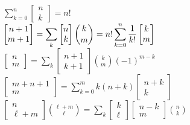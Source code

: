 ${\displaystyle \sum_{k=0}^n \left[\begin{matrix} n \\ k \end{matrix}\right] = n!}$\\
${\displaystyle \left[\begin{matrix} n+1 \\ m+1 \end{matrix}\right] = \sum_k \left[\begin{matrix} n \\ k \end{matrix}\right] {k \choose m} = n! \sum_{k=0}^n {1 \over k!} \left[\begin{matrix} k \\ m \end{matrix}\right]}$\\
${\displaystyle \left[\begin{matrix} n \\ m \end{matrix}\right] = \sum_k \left[\begin{matrix} n+1 \\ k+1 \end{matrix}\right] {k \choose m}(-1)^{m-k}}$~~~~
${\displaystyle \left[\begin{matrix} m+n+1 \\ m \end{matrix}\right] = \sum_{k=0}^m k(n+k)\left[\begin{matrix} n+k \\ k \end{matrix}\right]}$\\
${\displaystyle \left[\begin{matrix} n \\ {\ell+m} \end{matrix}\right] {\ell+m \choose \ell} = \sum_k \left[\begin{matrix} k \\ \ell \end{matrix}\right] \left[\begin{matrix} n-k \\ m \end{matrix}\right] {n \choose k}}$\\


